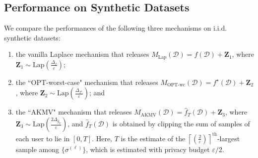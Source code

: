 \documentclass[conference,letterpaper]{IEEEtran}
\theoremstyle{remark}
\theoremstyle{definition}
\begin{document}
\subsection{Performance on Synthetic Datasets}
 
We compare the performances of the following three mechanisms on i.i.d. synthetic datasets:
\begin{enumerate}
	\item the vanilla Laplace mechanism that releases $M_{\text{Lap}}(\mathcal{D}) = f(\mathcal{D})+\mathbf{Z}_1$, where $\mathbf{Z}_1\sim \text{Lap}\left(\frac{\Delta_f}{\varepsilon}\right)$;
	\item the ``OPT-worst-case" mechanism that releases $M_{\text{OPT-wc}}(\mathcal{D}) = f^\star(\mathcal{D})+\mathbf{Z}_2$, where $\mathbf{Z}_2\sim \text{Lap}\left(\frac{\Delta_{f^\star}}{\varepsilon}\right)$; and
	\item the ``AKMV" mechanism \cite[Sec. 3]{amin} that releases $M_{\text{AKMV}}(\mathcal{D}) = \widehat{f}_T(\mathcal{D})+\mathbf{Z}_3$, where $\mathbf{Z}_3\sim \text{Lap}\left(\frac{2\Delta_{\widehat{g}_T}}{\varepsilon}\right)$, and $\widehat{f}_T(\mathcal{D})$ is obtained by clipping the sum of samples of each user to lie in $[0,T]$. Here, $T$ is the estimate of the $\left \lceil \left(\frac{2}{\varepsilon}\right)\right \rceil^{\text{th}}$-largest sample among $\{\sigma^{(\ell)}\}$, which is estimated with privacy budget $\varepsilon/2$.
\end{enumerate}
\end{document}

